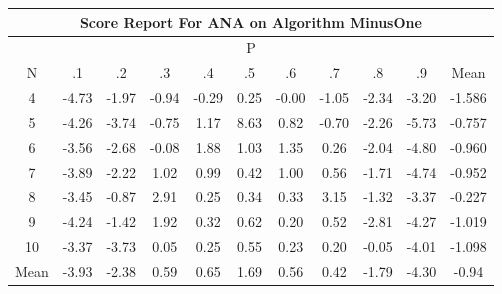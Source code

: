 \documentclass[11pt,a4paper]{report}
\begin{document}
\begin{longtable}{ | c || c | c | c | c | c | c | c | c | c || c |}
\hline
\multicolumn{11}{|c|}{ Score Report For ANA on Algorithm MinusOne} \\
\hline
\multicolumn{11}{|c|}{ P } \\
\hline
N & .1 & .2 & .3 & .4 & .5 & .6 & .7 & .8 & .9 & Mean\\
 \hline
 \hline
 \endhead
  4 &  \cellcolor[HTML]{FF8787} -4.73 &  \cellcolor[HTML]{FFCFCF} -1.97 &  \cellcolor[HTML]{FFE7E7} -0.94 &  \cellcolor[HTML]{FFF7F7} -0.29 &  \cellcolor[HTML]{F7F7FF} 0.25 &  \cellcolor[HTML]{FFFFFF} -0.00 &  \cellcolor[HTML]{FFE7E7} -1.05 &  \cellcolor[HTML]{FFC7C7} -2.34 &  \cellcolor[HTML]{FFAFAF} -3.20 & -1.586 \\
  5 &  \cellcolor[HTML]{FF9797} -4.26 &  \cellcolor[HTML]{FF9F9F} -3.74 &  \cellcolor[HTML]{FFEFEF} -0.75 &  \cellcolor[HTML]{DFDFFF} 1.17 &  \cellcolor[HTML]{2828FF} 8.63 &  \cellcolor[HTML]{E7E7FF} 0.82 &  \cellcolor[HTML]{FFEFEF} -0.70 &  \cellcolor[HTML]{FFC7C7} -2.26 &  \cellcolor[HTML]{FF7070} -5.73 & -0.757 \\
  6 &  \cellcolor[HTML]{FFA7A7} -3.56 &  \cellcolor[HTML]{FFBFBF} -2.68 &  \cellcolor[HTML]{FFFFFF} -0.08 &  \cellcolor[HTML]{CFCFFF} 1.88 &  \cellcolor[HTML]{E7E7FF} 1.03 &  \cellcolor[HTML]{DFDFFF} 1.35 &  \cellcolor[HTML]{F7F7FF} 0.26 &  \cellcolor[HTML]{FFCFCF} -2.04 &  \cellcolor[HTML]{FF8787} -4.80 & -0.960 \\
  7 &  \cellcolor[HTML]{FF9F9F} -3.89 &  \cellcolor[HTML]{FFC7C7} -2.22 &  \cellcolor[HTML]{E7E7FF} 1.02 &  \cellcolor[HTML]{E7E7FF} 0.99 &  \cellcolor[HTML]{F7F7FF} 0.42 &  \cellcolor[HTML]{E7E7FF} 1.00 &  \cellcolor[HTML]{EFEFFF} 0.56 &  \cellcolor[HTML]{FFD7D7} -1.71 &  \cellcolor[HTML]{FF8787} -4.74 & -0.952 \\
  8 &  \cellcolor[HTML]{FFA7A7} -3.45 &  \cellcolor[HTML]{FFE7E7} -0.87 &  \cellcolor[HTML]{B7B7FF} 2.91 &  \cellcolor[HTML]{F7F7FF} 0.25 &  \cellcolor[HTML]{F7F7FF} 0.34 &  \cellcolor[HTML]{F7F7FF} 0.33 &  \cellcolor[HTML]{AFAFFF} 3.15 &  \cellcolor[HTML]{FFDFDF} -1.32 &  \cellcolor[HTML]{FFA7A7} -3.37 & -0.227 \\
  9 &  \cellcolor[HTML]{FF9797} -4.24 &  \cellcolor[HTML]{FFDFDF} -1.42 &  \cellcolor[HTML]{CFCFFF} 1.92 &  \cellcolor[HTML]{F7F7FF} 0.32 &  \cellcolor[HTML]{EFEFFF} 0.62 &  \cellcolor[HTML]{F7F7FF} 0.20 &  \cellcolor[HTML]{EFEFFF} 0.52 &  \cellcolor[HTML]{FFB7B7} -2.81 &  \cellcolor[HTML]{FF9797} -4.27 & -1.019 \\
  10 &  \cellcolor[HTML]{FFA7A7} -3.37 &  \cellcolor[HTML]{FF9F9F} -3.73 &  \cellcolor[HTML]{FFFFFF} 0.05 &  \cellcolor[HTML]{F7F7FF} 0.25 &  \cellcolor[HTML]{EFEFFF} 0.55 &  \cellcolor[HTML]{F7F7FF} 0.23 &  \cellcolor[HTML]{F7F7FF} 0.20 &  \cellcolor[HTML]{FFFFFF} -0.05 &  \cellcolor[HTML]{FF9797} -4.01 & -1.098 \\
 \hline
 \hline
Mean &  \cellcolor[HTML]{FF9F9F} -3.93 &  \cellcolor[HTML]{FFC7C7} -2.38 &  \cellcolor[HTML]{EFEFFF} 0.59 &  \cellcolor[HTML]{EFEFFF} 0.65 &  \cellcolor[HTML]{D7D7FF} 1.69 &  \cellcolor[HTML]{EFEFFF} 0.56 &  \cellcolor[HTML]{F7F7FF} 0.42 &  \cellcolor[HTML]{FFCFCF} -1.79 &  \cellcolor[HTML]{FF8F8F} -4.30 &  \cellcolor[HTML]{FFE7E7} -0.94
\end{longtable}
\end{document}
